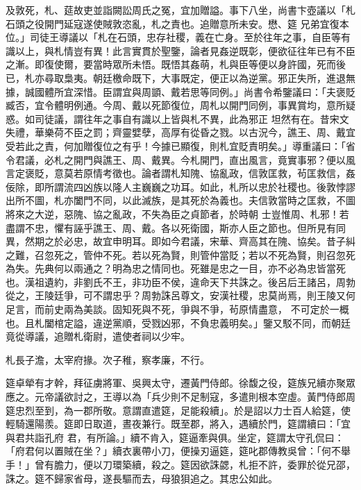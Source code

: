 \begin{pinyinscope}
 及敦死，札、莚故吏並詣闕訟周氏之冤，宜加贈謚。事下八坐，尚書卞壺議以「札石頭之役開門延寇遂使賊敦恣亂，札之責也。追贈意所未安。懋、筵
 兄弟宜復本位。」司徒王導議以「札在石頭，忠存社稷，義在亡身。至於往年之事，自臣等有識以上，與札情豈有異！此言實貫於聖鑒，論者見姦逆既彰，便欲征往年已有不臣之漸。即復使爾，要當時眾所未悟。既悟其姦萌，札與臣等便以身許國，死而後已，札亦尋取梟夷。朝廷檄命既下，大事既定，便正以為逆黨。邪正失所，進退無據，誠國體所宜深惜。臣謂宜與周顗、戴若思等同例。」尚書令希鑒議曰：「夫褒貶臧否，宜令體明例通。今周、戴以死節復位，周札以開門同例，事異賞均，意所疑惑。如司徒議，謂往年之事自有識以上皆與札不異，此為邪正
 坦然有在。昔宋文失禮，華樂荷不臣之罰；齊靈嬖孽，高厚有從昏之戮。以古況今，譙王、周、戴宜受若此之責，何加贈復位之有乎！今據已顯復，則札宜貶責明矣。」導重議曰：「省令君議，必札之開門與譙王、周、戴異。今札開門，直出風言，竟實事邪？便以風言定褒貶，意莫若原情考徵也。論者謂札知隗、協亂政，信敦匡救，茍匡救信，姦佞除，即所謂流四凶族以隆人主巍巍之功耳。如此，札所以忠於社稷也。後敦悖謬出所不圖，札亦闔門不同，以此滅族，是其死於為義也。夫信敦當時之匡救，不圖將來之大逆，惡隗、協之亂政，不失為臣之貞節者，於時朝
 士豈惟周、札邪！若盡謂不忠，懼有誣乎譙王、周、戴。各以死衛國，斯亦人臣之節也。但所見有同異，然期之於必忠，故宜申明耳。即如今君議，宋華、齊高其在隗、協矣。昔子糾之難，召忽死之，管仲不死。若以死為賢，則管仲當貶；若以不死為賢，則召忽死為失。先典何以兩通之？明為忠之情同也。死雖是忠之一目，亦不必為忠皆當死也。漢祖遺約，非劉氏不王，非功臣不侯，違命天下共誅之。後呂后王諸呂，周勃從之，王陵廷爭，可不謂忠乎？周勃誅呂尊文，安漢社稷，忠莫尚焉，則王陵又何足言，而前史兩為美談。固知死與不死，爭與不爭，茍原情盡意，
 不可定於一概也。且札闔棺定謚，違逆黨順，受戮凶邪，不負忠義明矣。」鑒又駁不同，而朝廷竟從導議，追贈札衛尉，遣使者祠以少牢。



 札長子澹，太宰府掾。次子稚，察孝廉，不行。



 筵卓犖有才幹，拜征虜將軍、吳興太守，遷黃門侍郎。徐馥之役，筵族兄續亦聚眾應之。元帝議欲討之，王導以為「兵少則不足制寇，多遣則根本空虛。黃門侍郎周筵忠烈至到，為一郡所敬。意謂直遣筵，足能殺續」。於是詔以力士百人給筵，使輕騎還陽羨。筵即日取道，晝夜兼行。既至郡，將入，遇續於門，筵謂續曰：「宜與君共詣孔府
 君，有所論。」續不肯入，筵逼牽與俱。坐定，筵謂太守孔侃曰：「府君何以置賊在坐？」續衣裏帶小刀，便操刃逼筵，筵叱郡傳教吳曾：「何不舉手！」曾有膽力，便以刀環築續，殺之。筵因欲誅勰，札拒不許，委罪於從兄邵，誅之。筵不歸家省母，遂長驅而去，母狼狽追之。其忠公如此。




\end{pinyinscope}
